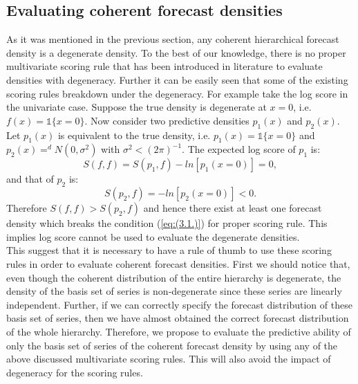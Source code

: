 \documentclass[a4paper, 11pt]{article}
\begin{document}



\subsection{Evaluating coherent forecast densities}

As it was mentioned in the previous section, any coherent hierarchical forecast density is a degenerate density. To the best of our knowledge, there is no proper multivariate scoring rule that has been introduced in literature to evaluate densities with degeneracy. Further it can be easily seen that some of the existing scoring rules breakdown under the degeneracy. For example take the log score in the univariate case. Suppose the true density is degenerate at $x=0$, i.e. $f(x)=\mathbb{1}\{x=0\}$.  Now consider two predictive densities $p_1(x)$ and $p_2(x)$. Let $p_1(x)$ is equivalent to the true density, i.e. $p_1(x)=\mathbb{1}\{x=0\}$ and $p_2(x) =^d N(0,\sigma^2)$ with $\sigma^2 < (2\pi)^{-1}$. The expected log score of $p_1$ is:
$$S(f,f) = S(p_1,f) -ln[p_1(x=0)]=0,$$
\noindent
and that of $p_2$ is:
$$S(p_2,f) = -ln[p_2(x=0)]<0.$$ 
\noindent
Therefore $S(f,f) > S(p_2,f)$ and hence there exist at least one forecast density which breaks the condition (\ref{eq:(3.1.)}) for proper scoring rule. This implies log score cannot be used to evaluate the degenerate densities.  \\

\noindent
This suggest that it is necessary to have a rule of thumb to use these scoring rules in order to evaluate coherent forecast densities. First we should notice that, even though the coherent distribution of the entire hierarchy is degenerate, the density of the basis set of series is non-degenerate since these series are linearly independent. Further, if we can correctly specify the forecast distribution of these basis set of series, then we have almost obtained the correct forecast distribution of the whole hierarchy. Therefore, we propose to evaluate the predictive ability of only the basis set of series of the coherent forecast density by using any of the above discussed multivariate scoring rules. This will also avoid the impact of degeneracy for the scoring rules. \\
\end{document}
